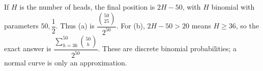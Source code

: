 If $H$ is the number of heads, the final position is $2H-50$, with $H$ binomial with parameters $50,\dfrac{1}{2}$. Thus (a) is $\boxed{\dfrac{\binom{50}{25}}{2^{50}}}$. For (b), $2H-50>20$ means $H\ge36$, so the exact answer is $\boxed{\dfrac{\sum_{h=36}^{50}\binom{50}{h}}{2^{50}}}$. These are discrete binomial probabilities; a normal curve is only an approximation.
